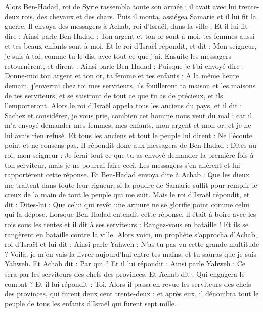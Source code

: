 \begin{multicols}{2}
\VerseOne{}Alors Ben-Hadad, roi de Syrie rassembla toute son armée ; il avait avec lui trente-deux rois, des chevaux et des chars. Puis il monta, assiégea Samarie et il lui fit la guerre.
Il envoya des messagers à Achab, roi d'Israël, dans la ville ;
Et il lui fit dire : Ainsi parle Ben-Hadad : Ton argent et ton or sont à moi, tes femmes aussi et tes beaux enfants sont à moi.
Et le roi d'Israël répondit, et dit : Mon seigneur, je suis à toi, comme tu le dis, avec tout ce que j'ai.
Ensuite les messagers retournèrent, et dirent : Ainsi parle Ben-Hadad : Puisque je t'ai envoyé dire : Donne-moi ton argent et ton or, ta femme et tes enfants ;
A la même heure demain, j'enverrai chez toi mes serviteurs, ils fouilleront ta maison et les maisons de tes serviteurs, et se saisiront de tout ce que tu as de précieux, et ils l'emporteront.
Alors le roi d'Israël appela tous les anciens du pays, et il dit : Sachez et considérez, je vous prie, combien cet homme nous veut du mal ; car il m’a envoyé demander mes femmes, mes enfants, mon argent et mon or, et je ne lui avais rien refusé.
Et tous les anciens et tout le peuple lui dirent : Ne l'écoute point et ne consens pas.
Il répondit donc aux messagers de Ben-Hadad : Dites au roi, mon seigneur : Je ferai tout ce que tu as envoyé demander la première fois à ton serviteur, mais je ne pourrai faire ceci. Les messagers s'en allèrent et lui rapportèrent cette réponse.
Et Ben-Hadad envoya dire à Achab : Que les dieux me traitent dans toute leur rigueur, si la poudre de Samarie suffit pour remplir le creux de la main de tout le peuple qui me suit.
Mais le roi d'Israël répondit, et dit : Dites-lui : Que celui qui revêt une armure ne se glorifie point comme celui qui la dépose.
Lorsque Ben-Hadad entendit cette réponse, il était à boire avec les rois sous les tentes et il dit à ses serviteurs : Rangez-vous en bataille ! Et ils se rangèrent en bataille contre la ville.
Alors voici, un prophète s’approcha d’Achab, roi d'Israël et lui dit : Ainsi parle Yahweh : N'as-tu pas vu cette grande multitude ? Voilà, je m'en vais la livrer aujourd'hui entre tes mains, et tu sauras que je suis Yahweh.
Et Achab dit : Par qui ? Et il lui répondit : Ainsi parle Yahweh : Ce sera par les serviteurs des chefs des provinces. Et Achab dit : Qui engagera le combat ? Et il lui répondit : Toi.
Alors il passa en revue les serviteurs des chefs des provinces, qui furent deux cent trente-deux ; et après eux, il dénombra tout le peuple de tous les enfants d'Israël qui furent sept mille.

\end{multicols}

